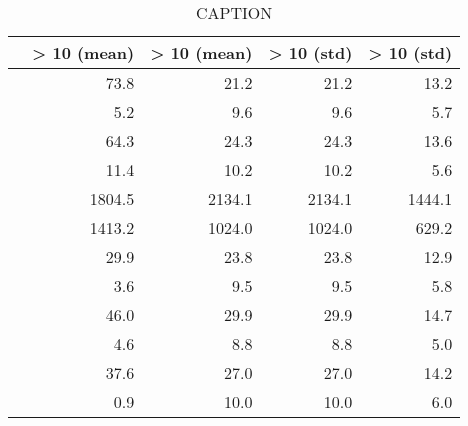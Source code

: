 \begin{table}
	 \centering
	 \begin{tabular}{lrrrr}
	\toprule
	{} &  \overshoot > 10 (mean) &  \overshoot > 10 (mean) &  \overshoot > 10 (std) &  \overshoot > 10 (std) \\
	\midrule
	\sclatencymu                &                    73.8 &                    21.2 &                   21.2 &                   13.2 \\
	\sclatencys                 &                     5.2 &                     9.6 &                    9.6 &                    5.7 \\
	\scthinkmu                  &                    64.3 &                    24.3 &                   24.3 &                   13.6 \\
	\scthinks                   &                    11.4 &                    10.2 &                   10.2 &                    5.6 \\
	\sctimehorizonmu            &                  1804.5 &                  2134.1 &                 2134.1 &                 1444.1 \\
	\sctimehorizons             &                  1413.2 &                  1024.0 &                 1024.0 &                  629.2 \\
	\scwaitTimeBetweenTradingmu &                    29.9 &                    23.8 &                   23.8 &                   12.9 \\
	\scwaitTimeBetweenTradings  &                     3.6 &                     9.5 &                    9.5 &                    5.8 \\
	\ssmmlatencymu              &                    46.0 &                    29.9 &                   29.9 &                   14.7 \\
	\ssmmlatencys               &                     4.6 &                     8.8 &                    8.8 &                    5.0 \\
	\ssmmthinkmu                &                    37.6 &                    27.0 &                   27.0 &                   14.2 \\
	\ssmmthinks                 &                     0.9 &                    10.0 &                   10.0 &                    6.0 \\
	\bottomrule
	\end{tabular}
	\label{LABEL}
	\caption{CAPTION}
\end{table}